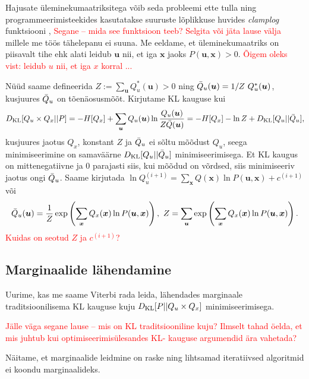 Hajusate üleminekumaatriksitega võib seda probleemi ette tulla ning programmeerimisteekides kasutatakse suuruste lõplikkuse huvides \emph{clamplog} funktsiooni \parencite{Bagaev.2022}, \textcolor{red}{Segane -- mida see funktsioon teeb? Selgita või jäta lause välja   }millele me töös tähelepanu ei suuna. Me eeldame, et üleminekumaatriks on piisavalt tihe ehk alati leidub $\bm{u}$ nii, et iga $\bm{x}$ jaoks $P(\bm{u},\bm{x}) > 0$. \textcolor{red}{Õigem oleks vist: leidub $u$ nii, et iga $x$ korral ...}

Nüüd saame defineerida $Z := \sum_{\bm{u}}Q_u^*(\bm{u}) > 0$ ning $\Bar{Q}_u(\bm{u}) = 1/Z \ Q^*_u(\bm{u})$, kusjuures $\Bar{Q}_u$ on tõenäosusmõõt. Kirjutame KL kauguse kui
$$D_{\mathrm{KL}}[Q_u \times Q_x || P] = -H[Q_x] + \sum_{\bm{u}} Q_u(\bm{u}) \ln \frac{Q_u(\bm{u})}{Z \Bar{Q}(\bm{u})} = -H[Q_x] - \ln Z + D_{\mathrm{KL}}[Q_u || \Bar{Q}_u],$$
kusjuures jaotus $Q_x$, konstant $Z$ ja $\Bar{Q}_u$ ei sõltu mõõdust $Q_u$, seega minimiseerimine on samaväärne $D_{\mathrm{KL}}[Q_u || \Bar{Q}_u]$ minimiseerimisega. Et KL kaugus on mittenegatiivne ja $0$ parajasti siis, kui mõõdud on võrdsed, siis minimiseeriv jaotus ongi $\Bar{Q}_u$. Saame kirjutada
$\ln Q_u^{(i+1)} = \sum_{\bm{x}}Q(\bm{x}) \ln P(\bm{u},\bm{x}) + c^{(i+1)}$ või
\begin{equation}
    \label{eq:general_update}
    \Bar{Q}_u(\bm{u}) = \frac{1}{Z} \exp \left( \sum_{\bm{x}} Q_x(\bm{x}) \ln P(\bm{u},\bm{x}) \right),\ Z = \sum_{\bm{u}}\exp \left( \sum_{\bm{x}} Q_x(\bm{x}) \ln P(\bm{u},\bm{x}) \right).
\end{equation}
\textcolor{red}{Kuidas on seotud $Z$ ja  $c^{(i+1)}$?}
\subsection{Marginaalide lähendamine}\label{sec:theory_approximating_marginals}

Uurime, kas me saame Viterbi rada leida, lähendades marginaale traditsioonilisema KL kauguse kuju $D_{\mathrm{KL}}[P || Q_u \times Q_x]$ minimiseerimisega. 

\textcolor{red}{Jälle väga segane lause -- mis on KL traditsiooniline kuju? Ilmselt tahad öelda, et mis juhtub kui optimiseerimisülesandes KL- kauguse argumendid ära vahetada?}


Näitame, et marginaalide leidmine on raske ning lihtsamad iteratiivsed algoritmid ei koondu marginaalideks.

